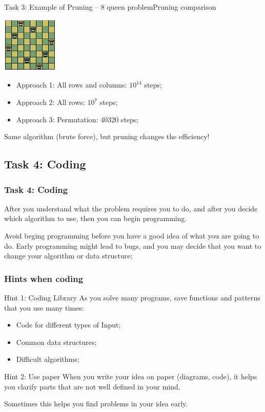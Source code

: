 \begin{frame}{Task 3: Example of Pruning -- 8 queen problem}{Pruning comparison}

  \hfill \includegraphics[width=0.2\textwidth]{img/8queen}
  \begin{itemize}
    \item Approach 1: All rows and columns: $10^{14}$ steps;
    \item Approach 2: All rows: $10^{7}$ steps;
    \item Approach 3: Permutation: 40320 steps;
  \end{itemize}
  \bigskip

  Same algorithm (brute force), but pruning changes the efficiency!
\end{frame}

\subsection{Task 4: Coding}

\begin{frame}
  \frametitle{Task 4: Coding}

  After you understand what the problem requires you to do, and after you decide which algorithm to use, then you can begin programming.
  \bigskip

  Avoid beging programming before you have a good idea of what you are going to do. Early programming might lead to bugs, and you may decide that you want to change your algorithm or data structure;
\end{frame}

\begin{frame}
  \frametitle{Hints when coding}
  \begin{exampleblock}{Hint 1: Coding Library}
    As you solve many programs, save functions and patterns that you use many times:
    \begin{itemize}
    \item Code for different types of Input;
    \item Common data structures;
    \item Difficult algorithms;
    \end{itemize}
   \end{exampleblock}

   \begin{block}{Hint 2: Use paper}
    When you write your idea on paper (diagrams, code), it helps you clarify parts that are not well defined in your mind.
    \medskip

    Sometimes this helps you find problems in your idea early.
  \end{block}
\end{frame}

